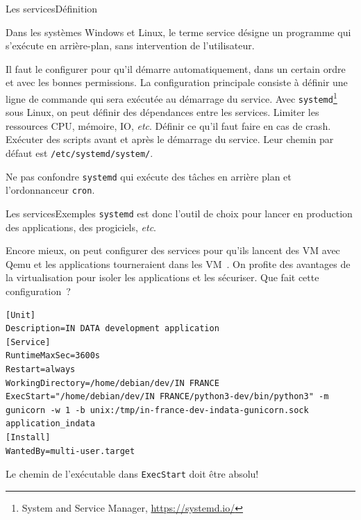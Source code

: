 \documentclass{beamer}
\begin{document}
    \begin{frame}{Les services}{Définition}
        \begin{footnotesize}
            Dans les systèmes Windows et Linux, le terme service désigne un programme qui s'exécute en arrière-plan, sans intervention de l'utilisateur.

            Il faut le configurer pour qu'il démarre automatiquement, dans un certain ordre et avec les bonnes permissions.
            \bigbreak
            La configuration principale consiste à définir une ligne de commande qui sera exécutée au démarrage du service.
            \bigbreak
            Avec \lstinline{systemd}\footnote{System and Service Manager, \url{https://systemd.io/}} sous Linux, on peut définir des dépendances entre les services.
            Limiter les ressources CPU, mémoire, IO, \textit{etc}.
            Définir ce qu'il faut faire en cas de crash.
            Exécuter des scripts avant et après le démarrage du service.
            \bigbreak
            Leur chemin par défaut est \lstinline{/etc/systemd/system/}.
            \begin{dangercolorbox}
                Ne pas confondre \lstinline{systemd} qui exécute des tâches en arrière plan et l'ordonnanceur \lstinline{cron}.
            \end{dangercolorbox}
        \end{footnotesize}
    \end{frame}

    \begin{frame}[fragile]{Les services}{Exemples}
        \lstinline{systemd} est donc l'outil de choix pour lancer en production des applications, des progiciels, \textit{etc}.

        Encore mieux, on peut configurer des services pour qu'ils lancent des VM avec Qemu et les applications tourneraient dans les VM~.
        On profite des avantages de la virtualisation pour isoler les applications et les sécuriser.
        \bigbreak
        Que fait cette configuration~?
        \begin{lstlisting}
[Unit]
Description=IN DATA development application
[Service]
RuntimeMaxSec=3600s
Restart=always
WorkingDirectory=/home/debian/dev/IN FRANCE
ExecStart="/home/debian/dev/IN FRANCE/python3-dev/bin/python3" -m gunicorn -w 1 -b unix:/tmp/in-france-dev-indata-gunicorn.sock application_indata
[Install]
WantedBy=multi-user.target
        \end{lstlisting}
        \begin{dangercolorbox}
            Le chemin de l'exécutable dans \lstinline{ExecStart} doit être absolu!
        \end{dangercolorbox}
    \end{frame}
\end{document}

